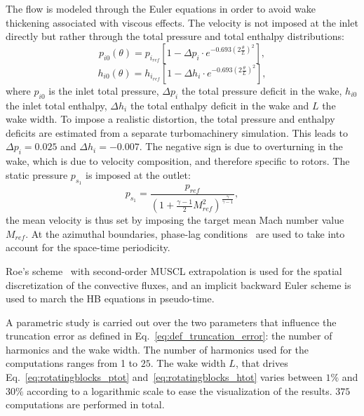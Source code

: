 The flow is modeled through the 
Euler equations in order to avoid wake thickening
associated with viscous effects. 
The velocity is not imposed at the inlet directly
but rather through the total pressure and total enthalpy distributions:
\begin{equation}
  \label{eq:rotatingblocks_ptot}
    p_{i0} (\theta) = p_{i_{ref}} \left[1 - 
        \Delta p_i \cdot e^{
          -0.693 \left( 2 \frac{\theta}{L} \right) ^ 2}\right],
\end{equation}
\begin{equation}
  \label{eq:rotatingblocks_htot}
    h_{i0} (\theta) = h_{i_{ref}} \left[1 - 
        \Delta h_i \cdot e^{
          -0.693 \left( 2 \frac{\theta}{L} \right) ^ 2}\right],
\end{equation}
where $p_{i0}$ is the inlet total pressure, $\Delta p_i$ the total pressure
deficit in the wake,
$h_{i0}$ the inlet total enthalpy, $\Delta h_i$ the total enthalpy
deficit in the wake and $L$ the wake width.
To impose a realistic distortion, the total pressure and
enthalpy deficits are estimated from a separate turbomachinery simulation.
This leads to $\Delta p_i = 0.025$ and 
$\Delta h_i = - 0.007$.
The negative sign is due to overturning in the wake, which
is due to velocity composition, and therefore specific to rotors.
The static pressure $p_{s_1}$ is imposed at the outlet:
\begin{equation}
    p_{s_1} = \frac{p_{ref}}{\left(1 + 
    \frac{\gamma - 1}{2} M_{ref}^2 \right) ^ {\frac{\gamma}{ \gamma - 1}}} ,
\end{equation}
the mean velocity is thus set by imposing the
target mean Mach number value $M_{ref}$.
At the azimuthal boundaries, phase-lag conditions~\cite{Erdos1977} 
are used to take into account for the space-time periodicity. %

Roe's scheme~\cite{Roe1981} with second-order MUSCL extrapolation 
is used for the spatial discretization of
the convective fluxes, and an implicit backward Euler scheme is used
to march the HB equations in pseudo-time.

A parametric study is carried out over the two parameters 
that influence the truncation error as defined in 
Eq.~\eqref{eq:def_truncation_error}: the number of harmonics and the wake width.
The number of harmonics used for the computations ranges from 1 to $25$.
The wake width $L$, that drives
Eq.~\eqref{eq:rotatingblocks_ptot} and~\eqref{eq:rotatingblocks_htot} varies
between $1\%$ and $30\%$ according to a logarithmic scale to ease 
the visualization of the results. $375$ computations are performed in total. 

